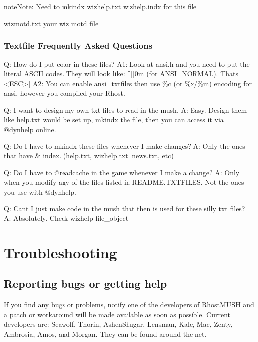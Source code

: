 \documentclass[letterpaper,10pt,english]{sphinxmanual}
\begin{document}
\begin{sphinxadmonition}{note}{Note:}
\sphinxAtStartPar
Need to mkindx wizhelp.txt wizhelp.indx for this file
\end{sphinxadmonition}

\sphinxAtStartPar
wizmotd.txt            \sphinxhyphen{} your wiz motd file


\subsection{Textfile Frequently Asked Questions}
\label{\detokenize{maintenance:textfile-frequently-asked-questions}}
\sphinxAtStartPar
Q:  How do I put color in these files?
A1: Look at ansi.h and you need to put the literal ASCII codes.  They will look like: \textasciicircum{}{[}{[}0m (for ANSI\_NORMAL).  That\textquotesingle{}s \textless{}ESC\textgreater{}{[}
A2: You can enable ansi\_txtfiles then use \%c (or \%x/\%m) encoding for ansi, however you compiled your Rhost.

\sphinxAtStartPar
Q:  I want to design my own txt files to read in the mush.
A:  Easy.  Design them like help.txt would be set up, mkindx the file, then you can access it via @dynhelp online.

\sphinxAtStartPar
Q:  Do I have to mkindx these files whenever I make changes?
A:  Only the ones that have \textquotesingle{}\& \textquotesingle{} index. (help.txt, wizhelp.txt, news.txt, etc)

\sphinxAtStartPar
Q:  Do I have to @readcache in the game whenever I make a change?
A:  Only when you modify any of the files listed in README.TXTFILES.  Not the ones you use with @dynhelp.

\sphinxAtStartPar
Q:  Can\textquotesingle{}t I just make code in the mush that then is used for these silly txt files?
A:  Absolutely.  Check \textquotesingle{}wizhelp file\_object\textquotesingle{}.


\chapter{Troubleshooting}
\label{\detokenize{troubleshooting:troubleshooting}}\label{\detokenize{troubleshooting::doc}}

\section{Reporting bugs or getting help}
\label{\detokenize{troubleshooting:reporting-bugs-or-getting-help}}
\sphinxAtStartPar
If you find any bugs or problems, notify one of the developers of RhostMUSH and
a patch or workaround will be made available as soon as possible.  Current
developers are:  Seawolf, Thorin, Ashen\sphinxhyphen{}Shugar, Lensman, Kale, Mac, Zenty,
Ambrosia, Amos, and Morgan.  They can be found around the net.
\end{document}
